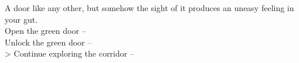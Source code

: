 A door like any other, but somehow the sight of it produces an uneasy feeling in your gut.\\

 Open the green door -- \\
 Unlock the green door -- \\
> Continue exploring the corridor -- 